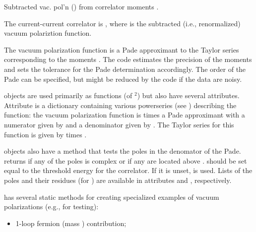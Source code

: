 \documentclass[letterpaper,10pt,english]{sphinxmanual}
\begin{document}
\begin{fulllineitems}
\label{\detokenize{g2tools:g2tools.vacpol}}
Subtracted vac. pol’n () from correlator moments .

The current-current correlator is , where
 is the subtracted (i.e., renormalized)
vacuum polariztion function.

The vacuum polarization function is a Pade approximant to the Taylor
series corresponding to the moments .  The code estimates the
precision of the moments and sets the tolerance for the Pade determination
accordingly. The order  of the Pade can be specified, but might
be reduced by the code if the data are noisy.

{\hyperref[\detokenize{g2tools:g2tools.vacpol}]{}} objects are used primarily as functions (of $^{\text{2}}$)
but also have several attributes. Attribute  is a dictionary
containing various powerseries (see ) describing the
function: the vacuum polarization function is  times a Pade
approximant  with a numerator given by  and a
denominator  given by . The Taylor series for this
function  is given by  times .

{\hyperref[\detokenize{g2tools:g2tools.vacpol}]{}} objects also have a method {\hyperref[\detokenize{g2tools:g2tools.vacpol.badpoles}]{}} that
tests the poles in the denomator of the Pade.  returns
 if any of the poles is complex or if any are located above
.  should be set equal to the threshold energy for
the correlator. If it is unset,  is used. Lists of the
poles and their residues (for ) are available in
attributes  and , respectively.

{\hyperref[\detokenize{g2tools:g2tools.vacpol}]{}} has several static methods for creating specialized
examples of vacuum polarizations (e.g., for testing):
\begin{itemize}
\item {} 
 \textendash{} 1-loop fermion (mass ) contribution;


\end{itemize}
\end{fulllineitems}
\end{document}

